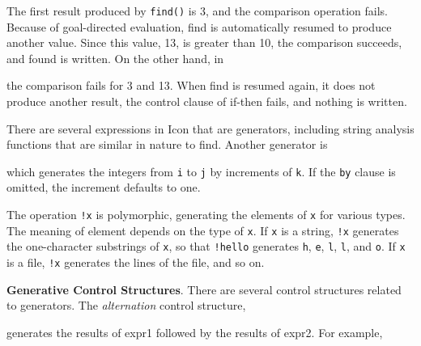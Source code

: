 The first result produced by \texttt{find()} is 3, and the comparison
operation fails. Because of goal-directed evaluation, find is
automatically resumed to produce another value. Since this value, 13,
is greater than 10, the comparison succeeds, and found is written. On
the other hand, in



\noindent the comparison fails for 3 and 13. When find is resumed
again, it does not produce another result, the control clause of
if-then fails, and nothing is written.

There are several expressions in Icon that are generators, including
string analysis functions that are similar in nature to find. Another
generator is



which generates the integers from \texttt{i} to \texttt{j} by
increments of \texttt{k}. If the \texttt{by} clause is omitted, the
increment defaults to one.

The operation \texttt{!x} is polymorphic, generating the elements of
\texttt{x} for various types. The meaning of
{\textquotedbl}element{\textquotedbl} depends on the type of
\texttt{x}. If \texttt{x} is a string, \texttt{!x} generates the
one-character substrings of \texttt{x}, so that
\texttt{!{\textquotedbl}hello{\textquotedbl}} generates
\texttt{{\textquotedbl}h{\textquotedbl}},
\texttt{{\textquotedbl}e{\textquotedbl}},
\texttt{{\textquotedbl}l{\textquotedbl}},
\texttt{{\textquotedbl}l{\textquotedbl}}, and
\texttt{{\textquotedbl}o{\textquotedbl}}. If \texttt{x} is a file,
\texttt{!x} generates the lines of the file, and so on.


\textbf{Generative Control Structures}. There are several control
structures related to generators. The \textit{alternation} control
structure,



\noindent
generates the results of expr1 followed by the results of expr2. For example,

